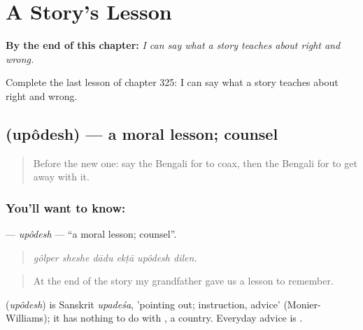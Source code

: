 
\chapter{A Story's Lesson}
\label{ch:bn-a-story-s-lesson}

\begin{chapteropening}
\textbf{By the end of this chapter:} \emph{I can say what a story teaches about right and wrong.}

Complete the last lesson of chapter 325: I can say what a story teaches about right and wrong.
\end{chapteropening}

\section[\texorpdfstring{\bn{উপদেশ} (upôdesh)}{উপদেশ (upôdesh)}]{ (upôdesh) — a moral lesson; counsel}

\label{lesson:BN-C325-upodesh}



\begin{quote}
Before the new one: say the Bengali for to coax, then the Bengali for to get away with it.
\end{quote}

\subsection*{You'll want to know: }
\textbf{} — \emph{upôdesh} — \textquotedblleft{}a moral lesson; counsel\textquotedblright{}.

\begin{quote}
     
\end{quote}

\begin{quote}
\emph{gôlper sheshe dādu ekṭā upôdesh dilen.}
\end{quote}

\begin{quote}
At the end of the story my grandfather gave us a lesson to remember.
\end{quote}

\begin{cousinweb}
\textbf{} (\emph{upôdesh}) is Sanskrit \emph{upadeśa}, 'pointing out; instruction, advice' (Monier-Williams); it has nothing to do with \textbf{}, a country. Everyday advice is \textbf{}.
\end{cousinweb}

